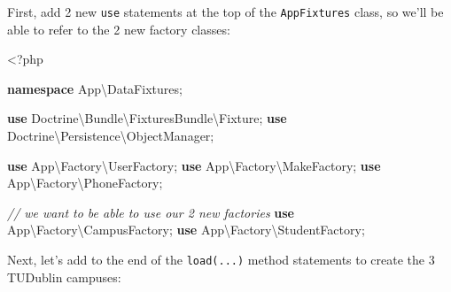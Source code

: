 \documentclass[a4paperpaper,openright]{book}
\newenvironment{Shaded}{}{}
\newcommand{\CommentTok}[1]{\textcolor[rgb]{0.38,0.63,0.69}{\textit{#1}}}
\newcommand{\KeywordTok}[1]{\textcolor[rgb]{0.00,0.44,0.13}{\textbf{#1}}}
\newcommand{\NormalTok}[1]{#1}
\newcommand{\OtherTok}[1]{\textcolor[rgb]{0.00,0.44,0.13}{#1}}
\newcommand{\StringTok}[1]{\textcolor[rgb]{0.25,0.44,0.63}{#1}}
\begin{document}
First, add 2 new \texttt{use} statements at the top of the
\texttt{AppFixtures} class, so we'll be able to refer to the 2 new
factory classes:

\begin{Shaded}
\begin{Highlighting}[]
\NormalTok{    <}\OtherTok{?}\NormalTok{php}
    
    \KeywordTok{namespace}\NormalTok{ App\textbackslash{}DataFixtures}\OtherTok{;}
    
    \KeywordTok{use}\NormalTok{ Doctrine\textbackslash{}Bundle\textbackslash{}FixturesBundle\textbackslash{}Fixture}\OtherTok{;}
    \KeywordTok{use}\NormalTok{ Doctrine\textbackslash{}Persistence\textbackslash{}ObjectManager}\OtherTok{;}
    
    \KeywordTok{use}\NormalTok{ App\textbackslash{}Factory\textbackslash{}UserFactory}\OtherTok{;}
    \KeywordTok{use}\NormalTok{ App\textbackslash{}Factory\textbackslash{}MakeFactory}\OtherTok{;}
    \KeywordTok{use}\NormalTok{ App\textbackslash{}Factory\textbackslash{}PhoneFactory}\OtherTok{;}
    
    \CommentTok{// we want to be able to use our 2 new factories}
    \KeywordTok{use}\NormalTok{ App\textbackslash{}Factory\textbackslash{}CampusFactory}\OtherTok{;}
    \KeywordTok{use}\NormalTok{ App\textbackslash{}Factory\textbackslash{}StudentFactory}\OtherTok{;}
\end{Highlighting}
\end{Shaded}

Next, let's add to the end of the \texttt{load(...)} method statements
to create the 3 TUDublin campuses:

\begin{Shaded}
\end{Shaded}
\end{document}
